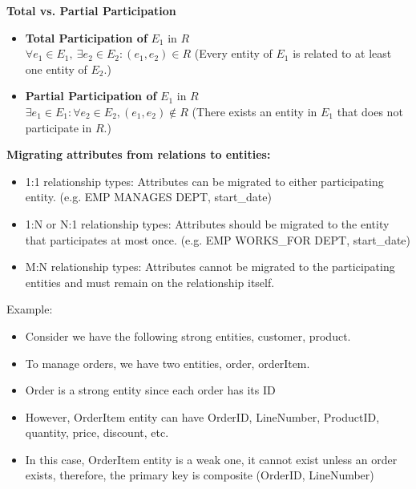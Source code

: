 \documentclass{article}
\begin{document}
\textbf{Total vs. Partial Participation}
\begin{itemize}
    \item \textbf{Total Participation of } $E_1$ in $R$ \\
    $\forall e_1 \in E_1, \ \exists e_2 \in E_2 : (e_1, e_2) \in R$  
    (Every entity of $E_1$ is related to at least one entity of $E_2$.)

    \item \textbf{Partial Participation of } $E_1$ in $R$ \\
    $\exists e_1 \in E_1: \forall e_2 \in E_2, (e_1, e_2) \notin R$  
    (There exists an entity in $E_1$ that does not participate in $R$.)
\end{itemize}

\textbf{Migrating attributes from relations to entities:}
\begin{itemize}
    \item 1:1 relationship types: Attributes can be migrated to either participating entity. (e.g. EMP MANAGES DEPT, start\_date)
    \item 1:N or N:1 relationship types: Attributes should be migrated to the entity that participates at most once. (e.g. EMP WORKS\_FOR DEPT, start\_date)
    \item M:N relationship types: Attributes cannot be migrated to the participating entities and must remain on the relationship itself.
\end{itemize}



Example: 
\begin{itemize}
    \item Consider we have the following strong entities, customer, product.
    \item To manage orders, we have two entities, order, orderItem.
    \item Order is a strong entity since each order has its ID
    \item However, OrderItem entity can have OrderID, LineNumber, ProductID, quantity, price, discount, etc.
    \item In this case, OrderItem entity is a weak one, it cannot exist unless an order exists, therefore, the primary key is composite (OrderID, LineNumber)
\end{itemize}
\end{document}
